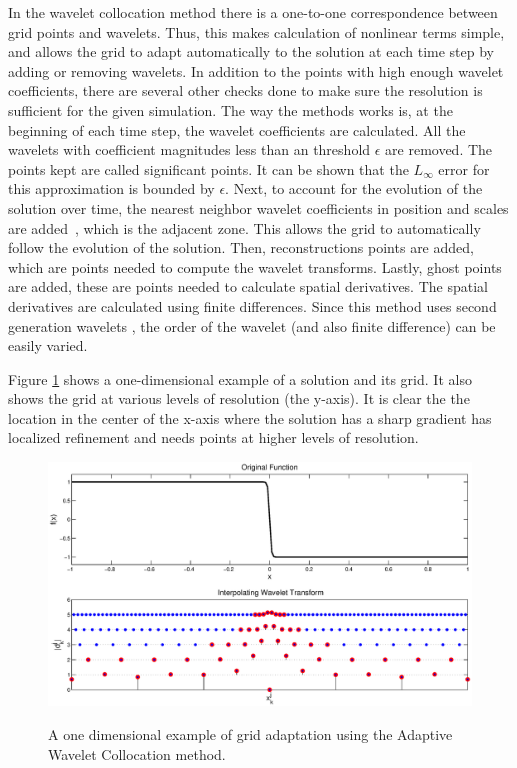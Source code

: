 In the wavelet collocation method there is a one-to-one correspondence between grid points and wavelets. Thus, this makes calculation of nonlinear terms simple, and allows the grid to adapt automatically to the solution at each time step by adding or removing wavelets.  In addition to the points with high enough wavelet coefficients, there are several other checks done to make sure the resolution is sufficient for the given simulation.  The way the methods works is, at the beginning of each time step, the wavelet coefficients are calculated.  All the wavelets with coefficient magnitudes less than an threshold $\epsilon$ are removed.  The points kept are called significant points.  It can be shown that the $L_{\infty}$ error for this approximation is bounded by $\epsilon$.  Next, to account for the evolution of the solution over time, the nearest neighbor wavelet coefficients in position and scales are added~\cite{liandrat-tchamitchian:1990}, which is the adjacent zone.  This allows the grid to automatically follow the evolution of the solution.  Then, reconstructions points are added, which are points needed to compute the wavelet transforms.  Lastly, ghost points are added, these are points needed to calculate spatial derivatives.  The spatial derivatives are calculated using finite differences.  Since this method uses second generation wavelets \cite{98Sweldens}, the order of the wavelet (and also finite difference) can be easily varied.  

Figure \ref{f:wavelets} shows a one-dimensional example of a solution and its grid.  It also shows the grid at various levels of resolution (the y-axis).  It is clear the the location in the center of the x-axis where the solution has a sharp gradient has localized refinement and needs points at higher levels of resolution.   

\begin{center}
\begin{figure}[h!]
\centering
  \includegraphics[width=5in]{Images/wavelet}\\
  \caption[1D example of AWCM.]{A one dimensional example of grid adaptation using the Adaptive Wavelet Collocation method.}\label{f:wavelets}
\end{figure}
\end{center}


